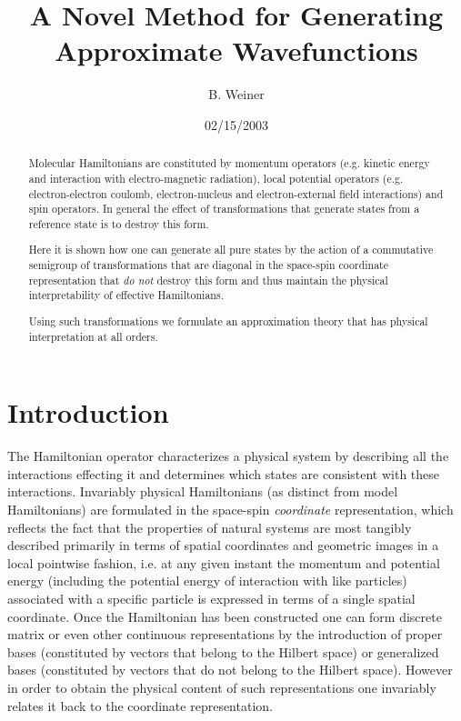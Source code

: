 \documentclass[aps,preprint]{revtex4}%
\begin{document}
\title[Diag\_Op]{A Novel Method for Generating Approximate Wavefunctions}
\author{B. Weiner}

\begin{abstract}
Molecular Hamiltonians are constituted by momentum operators (e.g. kinetic
energy and interaction with electro-magnetic radiation), local potential
operators (e.g. electron-electron coulomb, electron-nucleus and
electron-external field interactions) and spin operators. In general the
effect of transformations that generate states from a reference state is to
destroy this form.

Here it is shown how one can generate all pure states by the action of a
commutative semigroup of transformations that are diagonal in the space-spin
coordinate representation that \emph{do not }destroy\emph{ }this form and thus
maintain the physical interpretability of effective Hamiltonians.

Using such transformations we formulate an approximation theory that has
physical interpretation at all orders.

\end{abstract}
\date{02/15/2003}
\maketitle
\tableofcontents


\section{Introduction\label{Intro}}

The Hamiltonian operator characterizes a physical system by describing all the
interactions effecting it and determines which states are consistent with
these interactions. Invariably physical Hamiltonians (as distinct from model
Hamiltonians) are formulated in the space-spin \emph{coordinate}
representation, which reflects the fact that the properties of natural systems
are most tangibly described primarily in terms of spatial coordinates and
geometric images in a local pointwise fashion, i.e. at any given instant the
momentum and potential energy (including the potential energy of interaction
with like particles) associated with a specific particle is expressed in terms
of a single spatial coordinate. Once the Hamiltonian has been constructed one
can form discrete matrix or even other continuous representations by the
introduction of proper bases (constituted by vectors that belong to the
Hilbert space) or generalized bases (constituted by vectors that do not belong
to the Hilbert space). However in order to obtain the physical content of such
representations one invariably relates it back to the coordinate representation.
\end{document}
